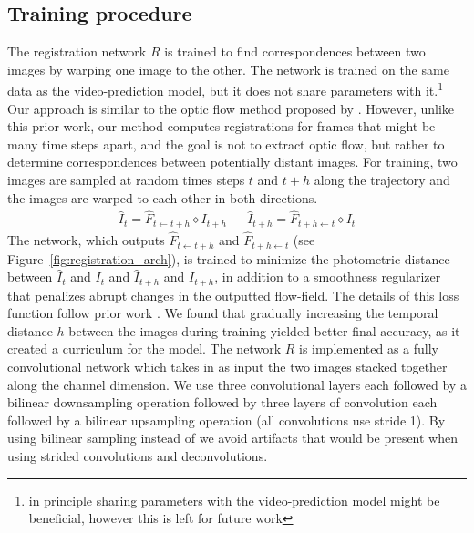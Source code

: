 
\subsection{Training procedure}

The registration network $R$ is trained to find correspondences between two images by warping one image to the other. The network is trained on the same data as the video-prediction model, but it does not share parameters with it.\footnote{in principle sharing parameters with the video-prediction model might be beneficial, however this is left for future work} Our approach is similar to the optic flow method proposed by \citet{meister2017unflow}. However, unlike this prior work, our method computes registrations for frames that might be many time steps apart, and the goal is not to extract optic flow, but rather to determine correspondences between potentially distant images. For training, two images are sampled at random times steps $t$ and $t+h$ along the trajectory and the images are warped to each other in both directions. 
\begin{align}
     \hat{I}_{t} = \hat{F}_{t \leftarrow t +h} \diamond  I_{t+h} &&
     \hat{I}_{t+h} = \hat{F}_{t+h \leftarrow t} \diamond  I_{t}
\end{align}
The network, which outputs $\hat{F}_{t \leftarrow t +h}$ and $\hat{F}_{t+h \leftarrow t}$ (see Figure~\ref{fig:registration_arch}), is trained to minimize the photometric distance between $\hat{I}_t$ and $I_t$ and $\hat{I}_{t+h}$ and $I_{t+h}$, in addition to a smoothness regularizer that penalizes abrupt changes in the outputted flow-field. The details of this loss function follow prior work \cite{meister2017unflow}. We found that gradually increasing the temporal distance $h$ between the images during training yielded better final accuracy, as it created a curriculum for the model.
The network $R$ is implemented as a fully convolutional network which takes in as input the two images stacked together along the channel dimension. We use three convolutional layers each followed by a bilinear downsampling operation followed by three layers of convolution each followed by a bilinear upsampling operation (all convolutions use stride 1). By using bilinear sampling instead of we avoid artifacts that would be present when using strided convolutions and deconvolutions.
